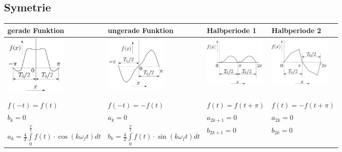 	\subsection{Symetrie}
		\begin{tabular}{|p{4.3cm}|p{4.3cm}|p{4.4cm}|p{4.4cm}|}
         	\hline
        	\textbf{gerade Funktion} & \textbf{ungerade Funktion} &
        	\textbf{Halbperiode 1} & \textbf{Halbperiode 2}\\
        	\hline
        	\includegraphics[width=3cm]{Content/Transformationen/gerade_funktion.png}&
        	\includegraphics[width=3cm]{Content/Transformationen/ungerade_funktion.png}&   
 			\includegraphics[width=3cm]{Content/Transformationen/halbperiode_1.png}&   
			\includegraphics[width=3cm]{Content/Transformationen/halbperiode_2.png}\\
			\hline & & & \\			
   			$f(-t)=f(t)$ & $f(-t)=-f(t)$ & $f(t)=f(t+\pi)$ & $f(t)=-f(t+\pi)$\\
   			$b_k=0$ & $a_k=0$ & $a_{2k+1}=0$ & $a_{2k}=0$\\
   			$a_k = \frac{4}{T} \int\limits_0^{\frac{T}{2}} f(t) \cdot \cos(k \omega_f
   			t) dt$ &
   			$b_k =  \frac{4}{T} \int\limits_0^{\frac{T}{2}} f(t) \cdot
			\sin(k \omega_f t) dt$ &
			$b_{2k+1}=0$ & $b_{2k}=0$\\
			\hline
      	\end{tabular} 
     	
